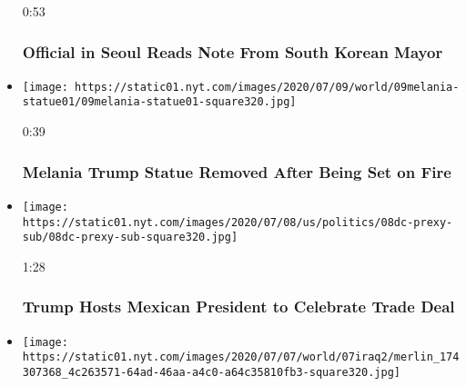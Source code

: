 \begin{itemize}
  0:53

  \hypertarget{official-in-seoul-reads-note-from-south-korean-mayor}{%
  \subsubsection{Official in Seoul Reads Note From South Korean
  Mayor}\label{official-in-seoul-reads-note-from-south-korean-mayor}}
\item
  \href{https://www.nytimes.com/video/us/100000007231708/melania-trump-statue-removed-after-being-set-on-fire.html?action=click\&module=video-series-bar\&region=header\&pgtype=Article\&playlistId=video/world}{}

  \texttt{[image: https://static01.nyt.com/images/2020/07/09/world/09melania-statue01/09melania-statue01-square320.jpg]}

  0:39

  \hypertarget{melania-trump-statue-removed-after-being-set-on-fire}{%
  \subsubsection{Melania Trump Statue Removed After Being Set on
  Fire}\label{melania-trump-statue-removed-after-being-set-on-fire}}
\item
  \href{https://www.nytimes.com/video/us/100000007230340/trump-hosts-mexican-president-to-celebrate-trade-deal.html?action=click\&module=video-series-bar\&region=header\&pgtype=Article\&playlistId=video/world}{}

  \texttt{[image: https://static01.nyt.com/images/2020/07/08/us/politics/08dc-prexy-sub/08dc-prexy-sub-square320.jpg]}

  1:28

  \hypertarget{trump-hosts-mexican-president-to-celebrate-trade-deal}{%
  \subsubsection{Trump Hosts Mexican President to Celebrate Trade
  Deal}\label{trump-hosts-mexican-president-to-celebrate-trade-deal}}
\item
  \href{https://www.nytimes.com/video/us/100000007227750/family-and-friends-mourn-killed-iraqi-analyst.html?action=click\&module=video-series-bar\&region=header\&pgtype=Article\&playlistId=video/world}{}

  \texttt{[image: https://static01.nyt.com/images/2020/07/07/world/07iraq2/merlin\_174307368\_4c263571-64ad-46aa-a4c0-a64c35810fb3-square320.jpg]}


\end{itemize}
